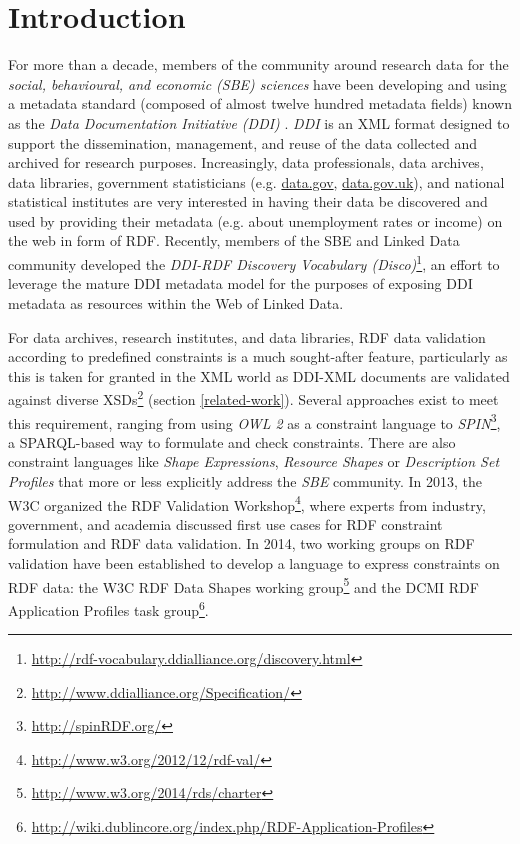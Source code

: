 \documentclass{llncs}
\newcommand{\tb}[1]{\todo[size=\small, color=green!40]{\textbf{Thomas:} #1}}
\begin{document}
\section{Introduction}


For more than a decade, members of the community around research data for the \emph{social, behavioural, and economic (SBE) sciences} have been developing and using a
metadata standard (composed of almost twelve hundred metadata fields) known as the \emph{Data Documentation Initiative (DDI)} \cite{Vardigan2008}.
\emph{DDI} is an XML format designed to support the dissemination, management,
and reuse of the data collected and archived for research purposes.  
Increasingly, data professionals, data archives, data libraries, government statisticians (e.g. \url{data.gov}, \url{data.gov.uk}), and national statistical institutes
are very interested in having their data be discovered and used by providing their metadata (e.g. about unemployment rates or income) on the web in form of RDF.
Recently, members of the SBE and Linked Data community developed the \emph{DDI-RDF Discovery Vocabulary (Disco)}\footnote{\url{http://rdf-vocabulary.ddialliance.org/discovery.html}}, 
an effort to leverage the mature DDI metadata model for the purposes of exposing DDI metadata as resources within the Web of Linked Data. 

For data archives, research institutes, and data libraries,
RDF data validation according to predefined constraints is a much sought-after feature, 
particularly as this is taken for granted in the XML world as DDI-XML documents are validated against diverse XSDs\footnote{\label{fnt:DDI-XSDs}\url{http://www.ddialliance.org/Specification/}} (section \ref{related-work}).
Several approaches exist to meet this requirement, ranging from using \emph{OWL 2} as a constraint language to \emph{SPIN}\footnote{\url{http://spinRDF.org/}}, a SPARQL-based way to formulate and check constraints. 
There are also constraint languages like \emph{Shape Expressions}, \emph{Resource Shapes} or \emph{Description Set Profiles} that more or less explicitly address the \emph{SBE} community.
In 2013, the W3C organized the RDF Validation Workshop\footnote{\url{http://www.w3.org/2012/12/rdf-val/}}, 
where experts from industry, government, and academia discussed first use cases for RDF constraint formulation and RDF data validation.
In 2014, two working groups on RDF validation have been established to develop a language to express constraints on RDF data: 
the W3C RDF Data Shapes working group\footnote{\url{http://www.w3.org/2014/rds/charter}} and the DCMI RDF Application Profiles task group\footnote{\url{http://wiki.dublincore.org/index.php/RDF-Application-Profiles}}. 
\end{document}
